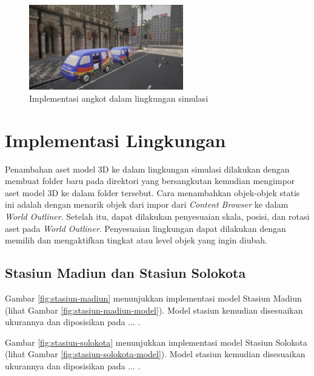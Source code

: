 \begin{figure}[!h]
    \centering
    \includegraphics[width=0.6\textwidth]{resources/chapter-4/angkot.png}
    \caption{Implementasi angkot dalam lingkungan simulasi}
    \label{fig:angkot-carla}
\end{figure}

\section{Implementasi Lingkungan}

Penambahan aset model 3D ke dalam lingkungan simulasi dilakukan dengan membuat
folder baru pada direktori yang bersangkutan kemudian mengimpor aset model 3D ke
dalam folder tersebut. Cara menambahkan objek-objek statis ini adalah dengan
menarik objek dari impor dari \textit{Content Browser} ke dalam \textit{World
Outliner}. Setelah itu, dapat dilakukan penyesuaian skala, posisi, dan rotasi
aset pada \textit{World Outliner}. Penyesuaian lingkungan dapat dilakukan dengan
memilih dan mengaktifkan tingkat atau level objek yang ingin diubah.



\subsection{Stasiun Madiun dan Stasiun Solokota}
Gambar \ref{fig:stasiun-madiun} menunjukkan implementasi model Stasiun Madiun
(lihat Gambar \ref{fig:stasiun-madiun-model}). Model stasiun kemudian
disesuaikan ukurannya dan diposisikan pada ... .

Gambar \ref{fig:stasiun-solokota} menunjukkan implementasi model Stasiun Solokota
(lihat Gambar \ref{fig:stasiun-solokota-model}). Model stasiun kemudian
disesuaikan ukurannya dan diposisikan pada ... .


